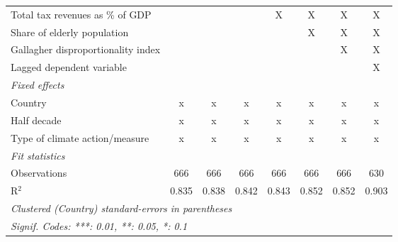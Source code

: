 \begin{table}[htbp]
\begin{tabular}{lccccccc}
      Total tax revenues as \% of GDP                                         &                &                &                & X              & X              & X              & X\\  
      Share of elderly population                                             &                &                &                &                & X              & X              & X\\  
      Gallagher disproportionality index                                      &                &                &                &                &                & X              & X\\  
      Lagged dependent variable                                               &                &                &                &                &                &                & X\\  
      \emph{Fixed effects}\\
      Country                                                                 & x              & x              & x              & x              & x              & x              & x\\  
      Half decade                                                             & x              & x              & x              & x              & x              & x              & x\\  
      Type of climate action/measure                                          & x              & x              & x              & x              & x              & x              & x\\  
      \midrule \emph{Fit statistics}\\
      Observations                                                            & 666            & 666            & 666            & 666            & 666            & 666            & 630\\  
      R$^2$                                                                   & 0.835          & 0.838          & 0.842          & 0.843          & 0.852          & 0.852          & 0.903\\  
      \midrule
      \multicolumn{8}{l}{\emph{Clustered (Country) standard-errors in parentheses}}\\
      \multicolumn{8}{l}{\emph{Signif. Codes: ***: 0.01, **: 0.05, *: 0.1}}\\
   \end{tabular}
\end{table}


